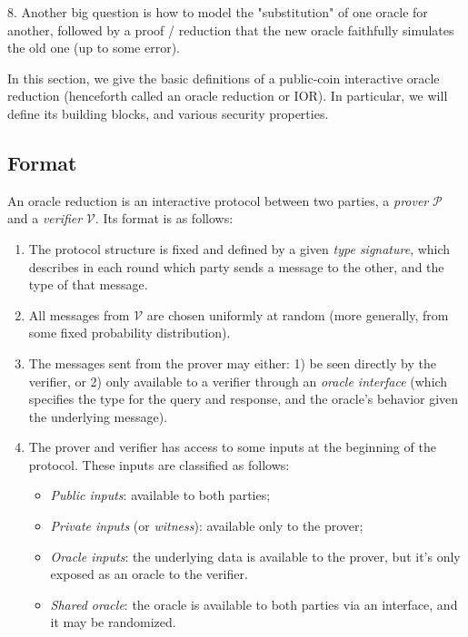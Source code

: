 8. Another big question is how to model the "substitution" of one oracle for another, followed by a proof / reduction that the new oracle faithfully simulates the old one (up to some error).

\fi

In this section, we give the basic definitions of a public-coin interactive oracle reduction
(henceforth called an oracle reduction or IOR). In particular, we will define its building blocks,
and various security properties.

\subsection{Format}

An oracle reduction is an interactive protocol between two parties, a \emph{prover} $\mathcal{P}$
and a \emph{verifier} $\mathcal{V}$. Its format is as follows:
\begin{enumerate}
    \item The protocol structure is fixed and defined by a given \emph{type signature}, which
    describes in each round which party sends a message to the other, and the type of that message.
    \item All messages from $\mathcal{V}$ are chosen uniformly at random (more generally, from some
    fixed probability distribution).
    \item The messages sent from the prover may either: 1) be seen directly by the verifier, or 2)
    only available to a verifier through an \emph{oracle interface} (which specifies the type for
    the query and response, and the oracle's behavior given the underlying message).
    \item The prover and verifier has access to some inputs at the beginning of the protocol. These inputs are classified as follows:
    \begin{itemize}
        \item \emph{Public inputs}: available to both parties;
        \item \emph{Private inputs} (or \emph{witness}): available only to the prover;
        \item \emph{Oracle inputs}: the underlying data is available to the prover, but it's only
        exposed as an oracle to the verifier.
        \item \emph{Shared oracle}: the oracle is available to both parties via an interface, and it
        may be randomized.
    \end{itemize}
\end{enumerate}

